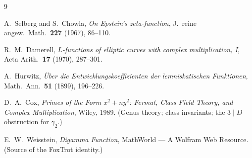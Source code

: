 \documentclass[11pt]{article}
\theoremstyle{remark}
\begin{document}
\begin{thebibliography}{9}

A.~Selberg and S.~Chowla, \emph{On Epstein's zeta-function}, J.~reine angew.\ Math.\
\textbf{227} (1967), 86--110.

R.~M.~Damerell, \emph{$L$-functions of elliptic curves with complex multiplication, I},
Acta Arith.\ \textbf{17} (1970), 287--301.

A.~Hurwitz, \emph{\"Uber die Entwicklungskoeffizienten der lemniskatischen Funktionen},
Math.\ Ann.\ \textbf{51} (1899), 196--226.

D.~A.~Cox, \emph{Primes of the Form $x^2+ny^2$: Fermat, Class Field Theory, and Complex
Multiplication}, Wiley, 1989. (Genus theory; class invariants; the $3\mid D$ obstruction
for $\gamma_2$.)

E.~W.~Weisstein, \emph{Digamma Function}, MathWorld --- A Wolfram Web Resource.
(Source of the FoxTrot identity.)

\end{thebibliography}
\end{document}
